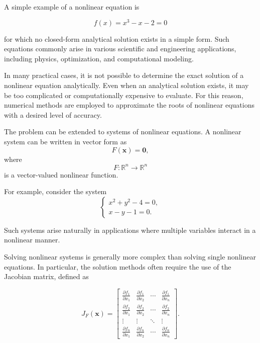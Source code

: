 A simple example of a nonlinear equation is

\begin{equation}
f(x) = x^3 - x - 2 = 0
\end{equation}

for which no closed-form analytical solution exists in a simple form. Such equations commonly arise in various scientific and engineering applications, including physics, optimization, and computational modeling.

In many practical cases, it is not possible to determine the exact solution of a nonlinear equation analytically. Even when an analytical solution exists, it may be too complicated or computationally expensive to evaluate. For this reason, numerical methods are employed to approximate the roots of nonlinear equations with a desired level of accuracy.

The problem can be extended to systems of nonlinear equations. 
A nonlinear system can be written in vector form as
\begin{equation}
F(\mathbf{x}) = \mathbf{0},
\end{equation}
where
\begin{equation}
F : \mathbb{R}^n \to \mathbb{R}^n
\end{equation}
is a vector-valued nonlinear function.

For example, consider the system
\begin{equation}
\begin{cases}
x^2 + y^2 - 4 = 0, \\
x - y - 1 = 0.
\end{cases}
\end{equation}

\noindent Such systems arise naturally in applications where multiple variables interact in a nonlinear manner.

Solving nonlinear systems is generally more complex than solving single nonlinear equations. In particular, the solution methods often require the use of the Jacobian matrix, defined as

\begin{equation}
J_F(\mathbf{x}) =
\begin{bmatrix}
\frac{\partial f_1}{\partial x_1} & \frac{\partial f_1}{\partial x_2} & \cdots & \frac{\partial f_1}{\partial x_n} \\
\frac{\partial f_2}{\partial x_1} & \frac{\partial f_2}{\partial x_2} & \cdots & \frac{\partial f_2}{\partial x_n} \\
\vdots & \vdots & \ddots & \vdots \\
\frac{\partial f_n}{\partial x_1} & \frac{\partial f_n}{\partial x_2} & \cdots & \frac{\partial f_n}{\partial x_n}
\end{bmatrix}.
\end{equation}

